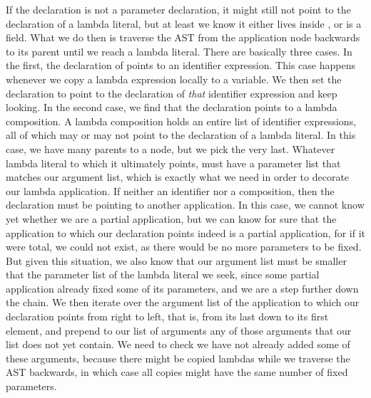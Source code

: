 If the  declaration is not a parameter declaration, it might still not point to the declaration of a lambda literal, but at least we know it either lives inside , or is a field. What we do then is traverse the AST from the application node backwards to its parent until we reach a lambda literal. There are basically three cases. In the first, the declaration of  points to an identifier expression. This case happens whenever we copy a lambda expression locally to a variable. We then set the declaration to point to the declaration of \emph{that} identifier expression and keep looking. In the second case, we find that the declaration points to a lambda composition. A lambda composition holds an entire list of identifier expressions, all of which may or may not point to the declaration of a lambda literal. In this case, we have many parents to a node, but we pick the very last. Whatever lambda literal to which it ultimately points, must have a parameter list that matches our argument list, which is exactly what we need in order to decorate our lambda application. If neither an identifier nor a composition, then the declaration must be pointing to another application. In this case, we cannot know yet whether we are a partial application, but we can know for sure that the application to which our declaration points indeed is a partial application, for if it were total, we could not exist, as there would be no more parameters to be fixed. But given this situation, we also know that our argument list must be smaller that the parameter list of the lambda literal we seek, since some partial application already fixed some of its parameters, and we are a step further down the chain. We then iterate over the argument list of the application to which our declaration points from right to left, that is, from its last down to its first element, and prepend to our list of arguments any of those arguments that our list does not yet contain. We need to check we have not already added some of these arguments, because there might be copied lambdas while we traverse the AST backwards, in which case all copies might have the same number of fixed parameters.

